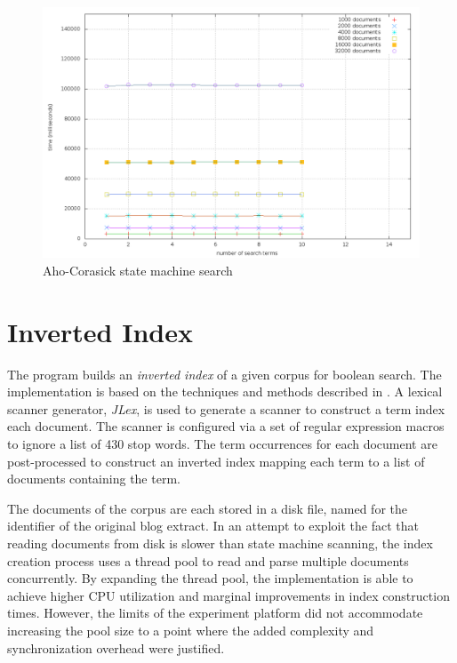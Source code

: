 \documentclass[10pt]{report}
\begin{document}
\begin{figure}
  \begin{center}
	\includegraphics[width=\textwidth,height=!]{ahosearch}
  \end{center}
  \caption{Aho-Corasick state machine search}
  \label{fig:ahosearch}
\end{figure} 

\section{Inverted Index}
The program builds an \textit{inverted index} of a given corpus for
boolean search. The implementation is based on the techniques and
methods described in \cite{RefWorks:109}. A lexical scanner generator,
\textit{JLex}\cite{RefWorks:112}, is used to generate a scanner to
construct a term index each document. The scanner is configured via a
set of regular expression macros to ignore a list of 430 stop
words. The term occurrences for each document are post-processed to
construct an inverted index mapping each term to a list of documents
containing the term.

The documents of the corpus are each stored in a disk file, named for
the identifier of the original blog extract. In an attempt to exploit
the fact that reading documents from disk is slower than state machine
scanning, the index creation process uses a thread pool to read and
parse multiple documents concurrently. By expanding the thread pool,
the implementation is able to achieve higher CPU utilization and
marginal improvements in index construction times. However, the limits
of the experiment platform did not accommodate increasing the pool
size to a point where the added complexity and synchronization
overhead were justified.
\end{document}

